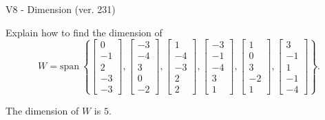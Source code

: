 \begin{exercise}
  \begin{exerciseTitle}V8 - Dimension (ver. 231)\end{exerciseTitle}
  \begin{exerciseStatement}
    Explain how to find the dimension of 
\[W=\mathrm{span}\ \left\{\left[\begin{array}{r}
0 \\
-1 \\
2 \\
-3 \\
-3
\end{array}\right] , \left[\begin{array}{r}
-3 \\
-4 \\
3 \\
0 \\
-2
\end{array}\right] , \left[\begin{array}{r}
1 \\
-4 \\
-3 \\
2 \\
2
\end{array}\right] , \left[\begin{array}{r}
-3 \\
-1 \\
-4 \\
3 \\
1
\end{array}\right] , \left[\begin{array}{r}
1 \\
0 \\
3 \\
-2 \\
1
\end{array}\right] , \left[\begin{array}{r}
3 \\
-1 \\
1 \\
-1 \\
-4
\end{array}\right]\right\}.\]



  \end{exerciseStatement}
  \begin{exerciseAnswer}
   The dimension of \(W\) is  \(5\).
  


  \end{exerciseAnswer}
\end{exercise}